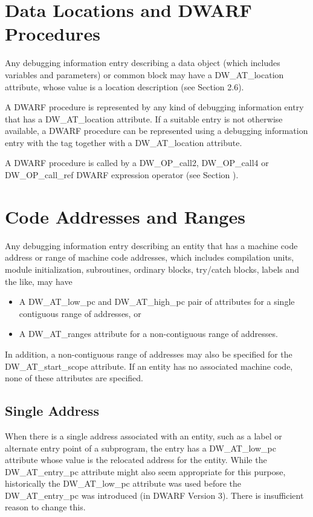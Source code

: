 \section{Data Locations and DWARF Procedures}
Any debugging information entry describing a data object (which
includes variables and parameters) or common block may have a
DW\-\_AT\-\_location attribute, whose value is a location description
(see Section 2.6).  

A DWARF procedure is represented by any
kind of debugging information entry that has a DW\-\_AT\-\_location
attribute. If a suitable entry is not otherwise available,
a DWARF procedure can be represented using a debugging
information entry with the 
tag 
together with a DW\-\_AT\-\_location attribute.  

A DWARF procedure
is called by a DW\-\_OP\-\_call2, 
DW\-\_OP\-\_call4 or 
DW\-\_OP\-\_call\-\_ref
DWARF expression operator 
(see Section ).

\section{Code Addresses and Ranges}
\label{chap:codeaddressesandranges}
Any debugging information entry describing an entity that has
a machine code address or range of machine code addresses,
which includes compilation units, module initialization,
subroutines, ordinary blocks, try/catch blocks, labels and
the like, may have

\begin{itemize}
\item A DW\-\_AT\-\_low\-\_pc and DW\-\_AT\-\_high\-\_pc pair of 
attributes for a single contiguous range of
addresses, or

\item A DW\-\_AT\-\_ranges attribute for a non-contiguous range of addresses.
\end{itemize}

In addition, a non-contiguous range of 
addresses may also be specified for the
DW\-\_AT\-\_start\-\_scope attribute.
If an entity has no associated machine code, 
none of these attributes are specified.

\subsection{Single Address} 
When there is a single address associated with an entity,
such as a label or alternate entry point of a subprogram,
the entry has a DW\-\_AT\-\_low\-\_pc attribute whose value is the
relocated address for the entity.  While the DW\-\_AT\-\_entry\-\_pc
attribute might also seem appropriate for this purpose,
historically the DW\-\_AT\-\_low\-\_pc attribute was used before the
DW\-\_AT\-\_entry\-\_pc was introduced (in DWARF Version 3). There is
insufficient reason to change this.

